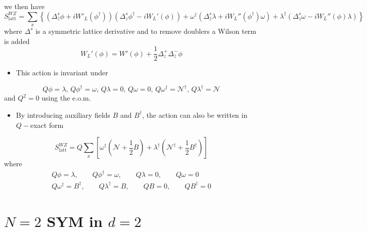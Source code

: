 we then have
\begin{equation}
    S_\text{latt}^{WZ} = \sum_x \left\{ (\Delta^s_{\bar{z}} \phi + i W'_L(\phi^\dagger)) (\Delta^s_z \phi^\dagger - i W_L'(\phi)) + \omega^\dagger(\Delta^s_{\bar{z}} \lambda + i W_L''(\phi^\dagger) \omega) + \lambda^\dagger(\Delta^s_z \omega - i W_L''(\phi)\lambda)\right\}
\end{equation}
where $\Delta^s$ is a symmetric lattice derivative and to remove doublers a Wilson term is added
\begin{equation}
    W_L'(\phi) = W'(\phi) + \frac{1}{2}\Delta^+_z \Delta^-_{\bar{z}}\phi
\end{equation}
\begin{itemize}
    \item This action is invariant under
\end{itemize}
\begin{equation}
    Q\phi = \lambda, \, Q \phi^\dagger = \omega, \, Q \lambda = 0, \, Q \omega = 0, \, Q \omega^\dagger = \mathcal{N}^\dagger, \, Q \lambda^\dagger = \mathcal{N}
\end{equation}
and $Q^2 = 0$ using the e.o.m.
\begin{itemize}
    \item By introducing auxiliary fields $B$ and $B^\dagger$, the action can also be written in $Q-$exact form 
\end{itemize}
\begin{equation}
    S_{\text{latt}}^{WZ} = Q \sum_x \left[ \omega^\dagger(\mathcal{N}+ \frac{1}{2}B) + \lambda^\dagger (\mathcal{N}^\dagger + \frac{1}{2}B^\dagger)\right]
\end{equation}
where
\begin{align}
    Q \phi = \lambda, \qquad Q \phi^\dagger = \omega, \qquad Q \lambda = 0, \qquad Q \omega = 0 \nonumber \\
    Q \omega^\dagger = B^\dagger, \qquad Q \lambda^\dagger = B, \qquad Q B = 0, \qquad Q B^\dagger = 0
\end{align}
\section{\(N=2\) SYM in \(d=2\)}

